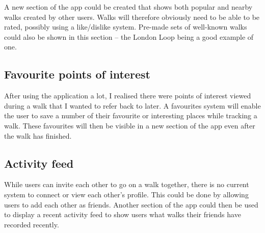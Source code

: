 A new section of the app could be created that shows both popular and nearby walks created by other users. Walks will therefore obviously need to be able to be rated, possibly using a like/dislike system. Pre-made sets of well-known walks could also be shown in this section -- the London Loop being a good example of one.

\subsection{Favourite points of interest}

After using the application a lot, I realised there were points of interest viewed during a walk that I wanted to refer back to later. A favourites system will enable the user to save a number of their favourite or interesting places while tracking a walk. These favourites will then be visible in a new section of the app even after the walk has finished.

\subsection{Activity feed}

While users can invite each other to go on a walk together, there is no current system to connect or view each other's profile. This could be done by allowing users to add each other as friends. Another section of the app could then be used to display a recent activity feed to show users what walks their friends have recorded recently.



